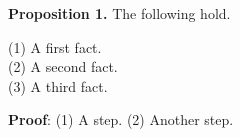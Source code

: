 \documentclass{article}
\begin{document}
{\bf Proposition 1.} The following hold.

(1) A first fact. \\

(2) A second fact. \\

(3) A third fact.

{\bf Proof}: (1) A step.
(2) Another step.
\end{document}
